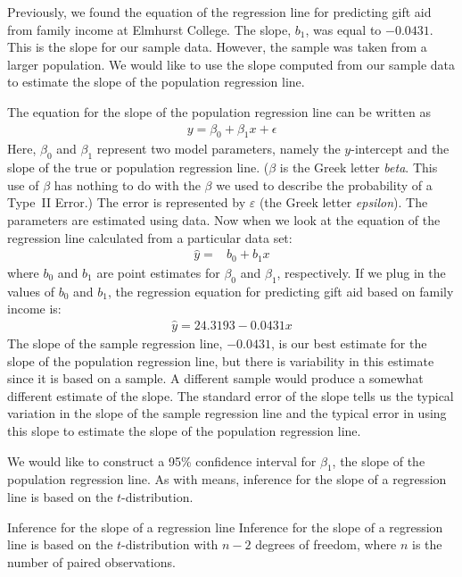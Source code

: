 Previously, we found the equation of the regression line for predicting gift aid from family income at Elmhurst College.  The slope, $b_1$, was equal to $-0.0431$.  This is the slope for our sample data.  However, the sample was taken from a larger population.   We would like to use the slope computed from our sample data to estimate the slope of the population regression line.

The equation for the slope of the population regression line can be written as
\begin{eqnarray*}
y = \beta_0 + \beta_1x +\epsilon
\end{eqnarray*}
Here, $\beta_0$ and $\beta_1$ represent two model parameters, namely the $y$-intercept and the slope of the true or population regression line. ($\beta$ is the Greek letter \emph{beta}. This use of $\beta$ has nothing to do with the $\beta$ we used to describe the probability of a Type~II Error.) The error is represented by $\varepsilon$
(the Greek letter \emph{epsilon}).
The parameters are estimated using data.  Now when we look at the equation of the regression line calculated from a particular data set:
\begin{align*}
\hat{y} =& b_0 + b_1x 
\end{align*}
where $b_0$ and $b_1$ are point estimates for $\beta_0$ and $\beta_1$, respectively.  
If we plug in the values of $b_0$ and $b_1$, the regression equation for predicting gift aid based on family income is:
\begin{align*}
\hat{y}=24.3193-0.0431x
\end{align*}
The slope of the sample regression line, $-0.0431$, is our best estimate for the slope of the population regression line, but there is variability in this estimate since it is based on a sample.  A different sample would produce a somewhat different estimate of the slope.  The standard error of the slope tells us the typical variation in the slope of the sample regression line and the typical error in using this slope to estimate the slope of the population regression line.  

We would like to construct a 95\% confidence interval for $\beta_1$, the slope of the population regression line. As with means, inference for the slope of a regression line is based on the $t$-distribution.



\begin{onebox}
{Inference for the slope of a regression line}
Inference for the slope of a regression line is based on the $t$-distribution with $n-2$ degrees of freedom, where $n$ is the number of paired observations.
\end{onebox}

